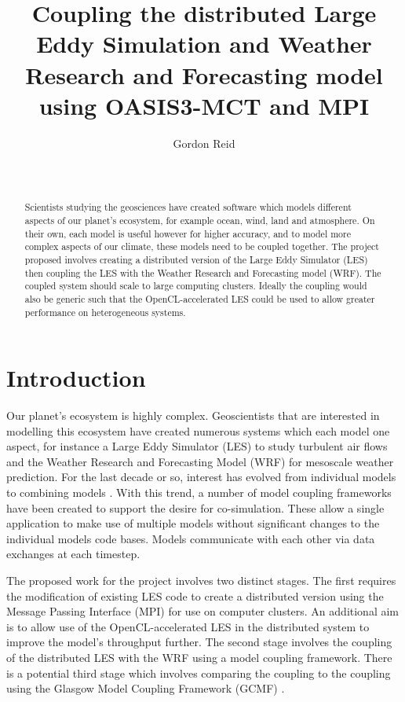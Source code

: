 \documentclass{acm_proc_article-sp}
\title{Coupling the distributed Large Eddy Simulation and Weather Research and
Forecasting model using OASIS3-MCT and MPI}
\author{
    \alignauthor
    Gordon Reid\\
    \affaddr{School of Computing Science}\\
    \affaddr{University of Glasgow}\\
    \email{1002536r@student.gla.ac.uk}
}
\renewcommand{\_}{\underscore\hspace{0pt}}
\begin{document}
\maketitle

\begin{abstract}

Scientists studying the geosciences have created software which models different
aspects of our planet's ecosystem, for example ocean, wind, land and atmosphere.
On their own, each model is useful however for higher accuracy, and to model
more complex aspects of our climate, these models need to be coupled together.
The project proposed involves creating a distributed version of the Large Eddy
Simulator (LES) then coupling the LES with the Weather Research and Forecasting
model (WRF). The coupled system should scale to large computing clusters.
Ideally the coupling would also be generic such that the OpenCL-accelerated LES
could be used to allow greater performance on heterogeneous systems.

\end{abstract}

\section*{Introduction}

Our planet's ecosystem is highly complex. Geoscientists that are interested in
modelling this ecosystem have created numerous systems which each model one
aspect, for instance a Large Eddy Simulator (LES) to study turbulent air flows
\cite{Nakayama2011,Nakayama2012} and the Weather Research and Forecasting Model
(WRF) for mesoscale weather prediction. For the last decade or so, interest has
evolved from individual models to combining models \cite{Michalakes2010}. With
this trend, a number of model coupling frameworks have been created to support
the desire for co-simulation. These allow a single application to make use of
multiple models without significant changes to the individual models code bases.
Models communicate with each other via data exchanges at each timestep.

The proposed work for the project involves two distinct stages. The first
requires the modification of existing LES code to create a distributed version
using the Message Passing Interface (MPI) for use on computer clusters. An
additional aim is to allow use of the OpenCL-accelerated LES
\cite{Vanderbauwhede2014} in the distributed system to improve the model's
throughput further. The second stage involves the coupling of the distributed
LES with the WRF using a model coupling framework. There is a potential third
stage which involves comparing the coupling to the coupling using the Glasgow
Model Coupling Framework (GCMF) \cite{Vanderbauwhede2014}.
\end{document}
